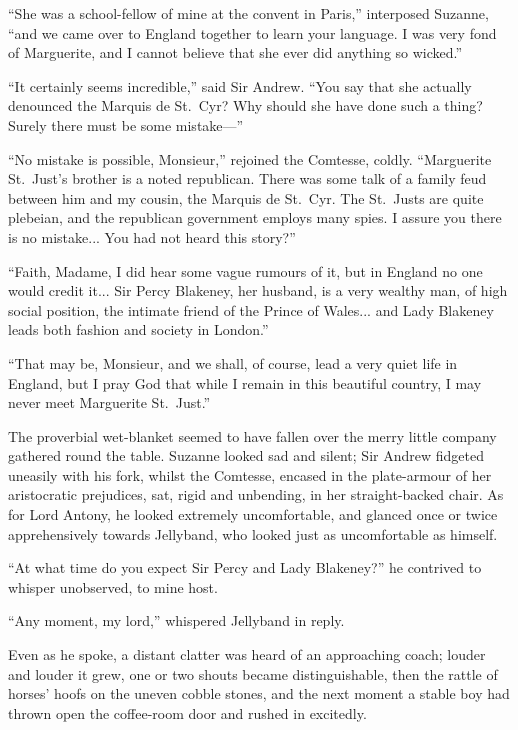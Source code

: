 \documentclass[paper=5.5in:8.5in,BCOR=7mm,twoside,DIV=calc,12pt,usegeometry,chapterprefix,endperiod,headings=big]{scrbook}
\begin{document}
\enquote{She was a school-fellow of mine at the convent in Paris,} interposed Suzanne, \enquote{and we came over to England together to learn your language. I was very fond of Marguerite, and I cannot believe that she ever did anything so wicked.}

\enquote{It certainly seems incredible,} said Sir Andrew. \enquote{You say that she actually denounced the Marquis de St.~Cyr? Why should she have done such a thing? Surely there must be some mistake---}

\enquote{No mistake is possible, Monsieur,} rejoined the Comtesse, coldly. \enquote{Marguerite St.~Just's brother is a noted republican. There was some talk of a family feud between him and my cousin, the Marquis de St.~Cyr. The St.~Justs are quite plebeian, and the republican government employs many spies. I assure you there is no mistake... You had not heard this story?}

\enquote{Faith, Madame, I did hear some vague rumours of it, but in England no one would credit it... Sir Percy Blakeney, her husband, is a very wealthy man, of high social position, the intimate friend of the Prince of Wales... and Lady Blakeney leads both fashion and society in London.}

\enquote{That may be, Monsieur, and we shall, of course, lead a very quiet life in England, but I pray God that while I remain in this beautiful country, I may never meet Marguerite St.~Just.}

The proverbial wet-blanket seemed to have fallen over the merry little company gathered round the table. Suzanne looked sad and silent; Sir Andrew fidgeted uneasily with his fork, whilst the Comtesse, encased in the plate-armour of her aristocratic prejudices, sat, rigid and unbending, in her straight-backed chair. As for Lord Antony, he looked extremely uncomfortable, and glanced once or twice apprehensively towards Jellyband, who looked just as uncomfortable as himself.

\enquote{At what time do you expect Sir Percy and Lady Blakeney?} he contrived to whisper unobserved, to mine host.

\enquote{Any moment, my lord,} whispered Jellyband in reply.

Even as he spoke, a distant clatter was heard of an approaching coach; louder and louder it grew, one or two shouts became distinguishable, then the rattle of horses’ hoofs on the uneven cobble stones, and the next moment a stable boy had thrown open the coffee-room door and rushed in excitedly.
\end{document}
